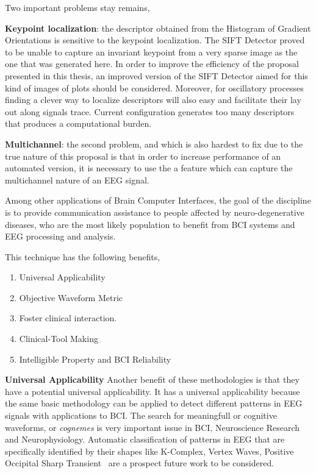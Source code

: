 Two important problems stay remains,

\textbf{Keypoint localization}: the descriptor obtained from the Histogram of Gradient Orientations is sensitive to the keypoint localization.  The SIFT Detector proved to be unable to capture an invariant keypoint from a very sparse image as the one that was generated here.  In order to improve the efficiency of the proposal presented in this thesis, an improved version of the SIFT Detector aimed for this kind of images of plots should be considered.  Moreover, for oscillatory processes finding a clever way to localize descriptors will also easy and facilitate their lay out along signals trace. Current configuration generates too many descriptors that produces a computational burden.

\textbf{Multichannel}: the second problem, and which is also hardest to fix due to the true nature of this proposal is that in order to increase performance of an automated version, it is necessary to use the a feature which can capture the multichannel nature of an EEG signal.


\begin{story}
Among other applications of Brain Computer Interfaces, the goal of the discipline is to provide communication assistance to people affected by neuro-degenerative diseases, who are the most likely population to benefit from BCI systems and EEG processing and analysis.
\end{story}

This technique has the following benefits,

\begin{enumerate}
\item Universal Applicability
\item Objective Waveform Metric
\item Foster clinical interaction.
\item Clinical-Tool Making
\item Intelligible Property and BCI Reliability
\end{enumerate}

\textbf{Universal Applicability}
Another benefit of these methodologies is that they have a potential universal applicability. It has a universal applicability because the same basic methodology can be applied to detect different patterns in EEG signals with applications to BCI.   The search for meaningfull or cognitive waveforms, or \textit{cognemes} is very important issue in BCI, Neuroscience Research and Neurophysiology. Automatic classification of patterns in EEG that are specifically identified by their shapes like K-Complex, Vertex Waves, Positive Occipital Sharp Transient~\cite{Hartman2005} are a prospect future work to be considered. 

